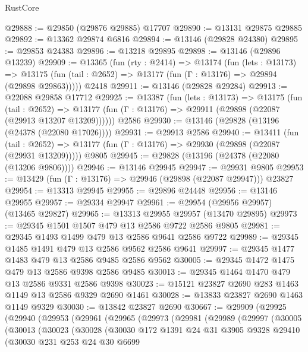 \begin{lexlean}{RustCore}
\begin{coremodule}
@29888 := @29850 (@29876 @29885) @17707
@29890 := @13131 @29875 @29885
@29892 := @13362 @29874 @6816
@29894 := @13146 (@29828 @24380)
@29895 := @29853 @24383
@29896 := @13218 @29895
@29898 := @13146 (@29896 @13239)
@29909 := @13365
    (fun (rty : @2414) =>
    @13174
      (fun (lets : @13173) =>
      @13175 (fun (tail : @2652) => @13177 (fun (Γ : @13176) => @29894 (@29898 @29863)))))
    @2418
@29911 := @13146 (@29828 @29284)
@29913 := @22088 @29858 @17712
@29925 := @13387
    (fun (lets : @13173) =>
    @13175
      (fun (tail : @2652) =>
      @13177 (fun (Γ : @13176) => @29911 (@29898 (@22087 (@29913 @13207 @13209))))))
    @2586
@29930 := @13146 (@29828 (@13196 (@24378 (@22080 @17026))))
@29931 := @29913 @2586
@29940 := @13411
    (fun (tail : @2652) => @13177 (fun (Γ : @13176) => @29930 (@29898 (@22087 (@29931 @13209)))))
    @9805
@29945 := @29828 (@13196 (@24378 (@22080 (@13206 @9806))))
@29946 := @13146 @29945
@29947 := @29931 @9805
@29953 := @13429 (fun (Γ : @13176) => @29946 (@29898 (@22087 @29947))) @23827
@29954 := @13313 @29945
@29955 := @29896 @24448
@29956 := @13146 @29955
@29957 := @29334 @29947
@29961 := @29954 (@29956 @29957) (@13465 @29827)
@29965 := @13313 @29955 @29957 (@13470 @29895)
@29973 := @29345 @1501 @1507 @479 @13 @2586 @9722 @2586 @9805
@29981 := @29345 @1493 @1499 @479 @13 @2586 @9641 @2586 @9722
@29989 := @29345 @1485 @1491 @479 @13 @2586 @9562 @2586 @9641
@29997 := @29345 @1477 @1483 @479 @13 @2586 @9485 @2586 @9562
@30005 := @29345 @1472 @1475 @479 @13 @2586 @9398 @2586 @9485
@30013 := @29345 @1464 @1470 @479 @13 @2586 @9331 @2586 @9398
@30023 := @15121 @23827 @2690 @283 @1463 @1149 @13 @2586 @9329 @2690 @1461
@30028 := @13833 @23827 @2690 @1463 @1149 @9329
@30030 := @13842 @23827 @2690
@30667 := @29909
    (@29925
      (@29940
        (@29953
          (@29961
            (@29965
              (@29973
                (@29981
                  (@29989
                    (@29997
                      (@30005
                        (@30013
                          (@30023
                            (@30028
                              (@30030
                                @172
                                @1391
                                @24
                                @31
                                @3905
                                @9328
                                @29410
                                (@30030
                                  @231
                                  @253
                                  @24
                                  @30
                                  @6699

\end{coremodule}
\end{lexlean}
